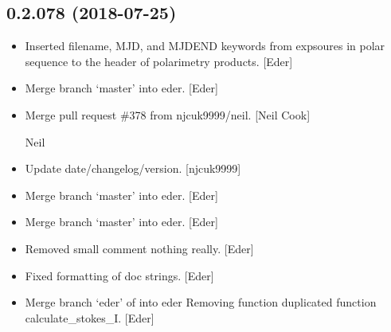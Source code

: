 \documentclass[a4paper,10pt,english]{report}
\begin{document}
\subsection{0.2.078 (2018-07-25)}
\label{\detokenize{misc/changelog:id384}}\begin{itemize}
\item {} 
Inserted filename, MJD, and MJDEND keywords from expsoures in polar
sequence to the header of polarimetry products. {[}Eder{]}

\item {} 
Merge branch ‘master’ into eder. {[}Eder{]}

\item {} 
Merge pull request \#378 from njcuk9999/neil. {[}Neil Cook{]}

Neil

\item {} 
Update date/changelog/version. {[}njcuk9999{]}

\item {} 
Merge branch ‘master’ into eder. {[}Eder{]}

\item {} 
Merge branch ‘master’ into eder. {[}Eder{]}

\item {} 
Removed small comment \textendash{} nothing really. {[}Eder{]}

\item {} 
Fixed formatting of doc strings. {[}Eder{]}

\item {} 
Merge branch ‘eder’ of  into
eder Removing function duplicated function calculate\_stokes\_I. {[}Eder{]}

\end{itemize}
\end{document}
